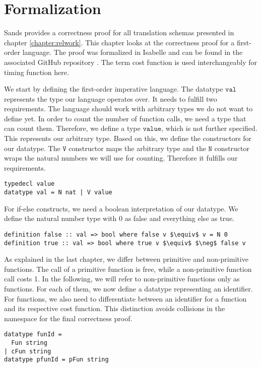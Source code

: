 
\chapter{Formalization}\label{chapter:formal}

Sands provides a correctness proof for all translation schemas presented in chapter \ref{chapter:relwork}.
This chapter looks at the correctness proof for a first-order language.
The proof was formalized in Isabelle and can be found in the associated GitHub repository \parencite{repo}.
The term cost function is used interchangeably for timing function here.

We start by defining the first-order imperative language.
The datatype $\texttt{val}$ represents the type our language operates over.
It needs to fulfill two requirements.
The language should work with arbitrary types we do not want to define yet.
In order to count the number of function calls, we need a type that can count them.
Therefore, we define a type $\texttt{value}$, which is not further specified.
This represents our arbitrary type.
Based on this, we define the constructors for our datatype.
The $\texttt{V}$ constructor maps the arbitrary type and the $\texttt{N}$ constructor wraps the natural numbers we will use for counting.
Therefore it fulfills our requirements.
\begin{lstlisting}[language=isabelle]
typedecl value
datatype val = N nat | V value
\end{lstlisting}

For if-else constructs, we need a boolean interpretation of our datatype.
We define the natural number type with 0 as false and everything else as true.
\begin{lstlisting}[mathescape=true,language=isabelle]
definition false :: val => bool where false v $\equiv$ v = N 0
definition true :: val => bool where true v $\equiv$ $\neg$ false v
\end{lstlisting}

As explained in the last chapter, we differ between primitive and non-primitive functions.
The call of a primitive function is free, while a non-primitive function call costs 1.
In the following, we will refer to non-primitive functions only as functions.
For each of them, we now define a datatype representing an identifier.
For functions, we also need to differentiate between an identifier for a function and its respective cost function.
This distinction avoids collisions in the namespace for the final correctness proof.
\begin{lstlisting}[language=isabelle]
datatype funId =
  Fun string
| cFun string
datatype pfunId = pFun string
\end{lstlisting}

